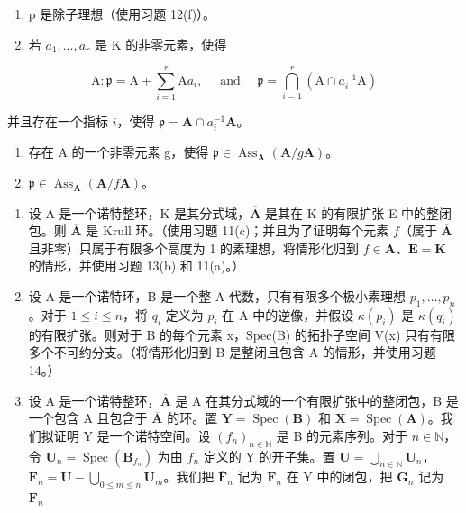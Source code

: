 \begin{enumerate}
\def\labelenumi{\alph{enumi})}
\setcounter{enumi}{1}
\item
  p 是除子理想（使用习题 12(f)）。
\item
  若 \(a_{1},\ldots,a_{r}\) 是 K 的非零元素，使得
\end{enumerate}

\[
\mathrm{A}: \mathfrak {p} = \mathrm{A} + \sum_ {i = 1} ^ {r} \mathrm{A} a _ {i}, \quad \text { and } \quad \mathfrak {p} = \bigcap_ {i = 1} ^ {r} (\mathrm{A} \cap a _ {i} ^ {- 1} \mathrm{A})
\]

并且存在一个指标 \(i\)，使得 \(\mathfrak{p} = \mathbf{A} \cap a_i^{-1}\mathbf{A}\)。

\begin{enumerate}
\def\labelenumi{\alph{enumi})}
\setcounter{enumi}{3}
\item
  存在 A 的一个非零元素 g，使得 \(\mathfrak{p} \in \operatorname{Ass}_{\mathbf{A}}(\mathbf{A}/g\mathbf{A})\)。
\item
  \(\mathfrak{p} \in \operatorname{Ass}_{\mathbf{A}}(\mathbf{A}/f\mathbf{A})\)。
\end{enumerate}

\begin{enumerate}
\def\labelenumi{\arabic{enumi})}
\setcounter{enumi}{13}
\item
  设 A 是一个诺特整环，K 是其分式域，\(\overline{\mathbf{A}}\) 是其在 K 的有限扩张 E 中的整闭包。则 \(\overline{\mathbf{A}}\) 是 Krull 环。（使用习题 11(c)；并且为了证明每个元素 \(f\)（属于 \(\overline{\mathbf{A}}\) 且非零）只属于有限多个高度为 1 的素理想，将情形化归到 \(f \in \mathbf{A}\)、\(\mathbf{E} = \mathbf{K}\) 的情形，并使用习题 13(b) 和 11(a)。）
\item
  设 A 是一个诺特环，B 是一个整 A-代数，只有有限多个极小素理想 \(p_{1}, \ldots, p_{n}\)。对于 \(1 \leqslant i \leqslant n\)，将 \(q_{i}\) 定义为 \(p_{i}\) 在 A 中的逆像，并假设 \(\kappa(p_{i})\) 是 \(\kappa(q_{i})\) 的有限扩张。则对于 B 的每个元素 x，Spec(B) 的拓扑子空间 V(x) 只有有限多个不可约分支。（将情形化归到 B 是整闭且包含 A 的情形，并使用习题 14。）
\item
  设 A 是一个诺特整环，\(\overline{\mathbf{A}}\) 是 A 在其分式域的一个有限扩张中的整闭包，B 是一个包含 A 且包含于 \(\overline{\mathbf{A}}\) 的环。置 \(\mathbf{Y} = \operatorname{Spec}(\mathbf{B})\) 和 \(\mathbf{X} = \operatorname{Spec}(\mathbf{A})\)。我们拟证明 Y 是一个诺特空间。设 \((f_n)_{n \in \mathbb{N}}\) 是 B 的元素序列。对于 \(n \in \mathbb{N}\)，令 \(\mathbf{U}_n = \operatorname{Spec}(\mathbf{B}_{f_n})\) 为由 \(f_n\) 定义的 Y 的开子集。置 \(\mathbf{U} = \bigcup_{n \in \mathbb{N}} \mathbf{U}_n\)，\(\mathbf{F}_n = \mathbf{U} - \bigcup_{0 \leqslant m \leqslant n} \mathbf{U}_m\)。我们把 \(\overline{\mathbf{F}}_n\) 记为 \(\mathbf{F}_n\) 在 Y 中的闭包，把 \(\mathbf{G}_n\) 记为 \(\mathbf{F}_n\)
\end{enumerate}


